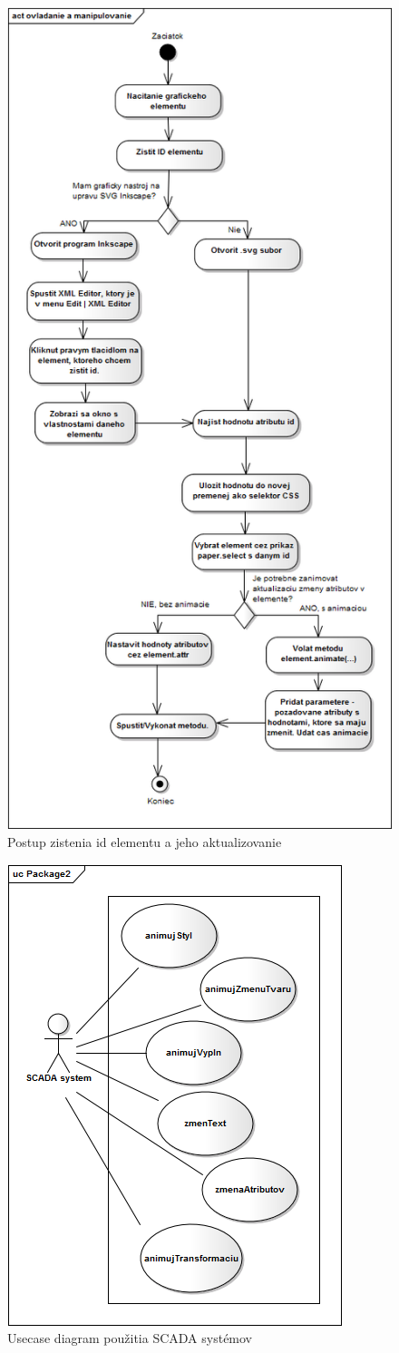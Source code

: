 \begin{figure}
	\centering
	\includegraphics[width=0.6\linewidth]{uml/aktivity2.png}
	\caption{Postup zistenia id elementu a jeho aktualizovanie}
	\label{fig:ovladanie}
\end{figure}


\begin{figure}
\centering
\includegraphics{uml/usecase.png}
\caption{Usecase diagram použitia SCADA systémov}
\label{fig:USECASE}
\end{figure}



